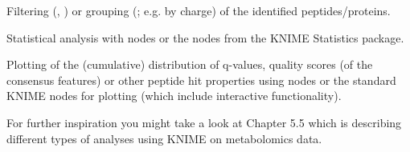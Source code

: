 \begin{task}
Filtering (, ) or grouping (; e.g. by charge) of the identified peptides/proteins.
\end{task}
\begin{task}
Statistical analysis with  nodes or the nodes from the KNIME Statistics package.
\end{task}
\begin{task}
Plotting of the (cumulative) distribution of q-values, quality scores (of the consensus features) or other peptide hit properties using  nodes or the standard KNIME nodes for plotting (which include interactive functionality).
\end{task}
\begin{task}
For further inspiration you might take a look at Chapter 5.5 which is describing different types of analyses using KNIME on metabolomics data.
\end{task}
